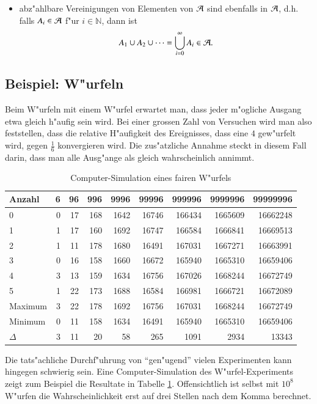 \begin{itemize}
\it
\item[ ] abz"ahlbare Vereinigungen von Elementen von $\cal A$ sind ebenfalls
in $\cal A$, d.h. falls $A_i\in{\cal A}$ f"ur $i\in\mathbb{N}$, dann ist
\[
A_1\cup A_2\cup\dots=\bigcup_{i=0}^{\infty}A_i \in{\cal A}.
\]
\end{itemize}

\subsection{Beispiel: W"urfeln}
Beim W"urfeln mit einem W"urfel erwartet man, dass jeder m"ogliche
Ausgang etwa gleich h"aufig sein wird. Bei einer grossen Zahl von
Versuchen wird man also feststellen, dass die relative H"aufigkeit
des Ereignisses, dass eine $4$ gew"urfelt wird, gegen $\frac16$
konvergieren wird. Die zus"atzliche Annahme steckt in diesem Fall
darin, dass man alle Ausg"ange als gleich wahrscheinlich annimmt.

\begin{table}
\begin{center}
\begin{tabular}{|l|r|r|r|r|r|r|r|r|}
\hline
Anzahl&6&96&996&9996&99996&999996&9999996&99999996\\
\hline
0& 0& 17& 168& 1642& 16746& 166434& 1665609& 16662248\\
1& 1& 17& 160& 1692& 16747& 166584& 1666841& 16669513\\
2& 1& 11& 178& 1680& 16491& 167031& 1667271& 16663991\\
3& 0& 16& 158& 1660& 16672& 165940& 1665310& 16659406\\
4& 3& 13& 159& 1634& 16756& 167026& 1668244& 16672749\\
5& 1& 22& 173& 1688& 16584& 166981& 1666721& 16672089\\
\hline
Maximum& 3& 22& 178& 1692& 16756& 167031& 1668244& 16672749\\
Minimum& 0& 11& 158& 1634& 16491& 165940& 1665310& 16659406\\
$\Delta$& 3& 11& 20& 58& 265& 1091& 2934& 13343\\
\hline
\end{tabular}
\end{center}
\caption{Computer-Simulation eines fairen W"urfels\label{wuerfel-simulation}}
\end{table}

Die tats"achliche Durchf"uhrung von ``gen"ugend'' vielen Experimenten
kann hingegen schwierig sein. Eine Computer-Simulation des
W"urfel-Experiments zeigt zum Beispiel die Resultate in Tabelle
\ref{wuerfel-simulation}. Offensichtlich ist selbst mit $10^8$
W"urfen die Wahrscheinlichkeit erst auf drei Stellen nach dem Komma
berechnet.


